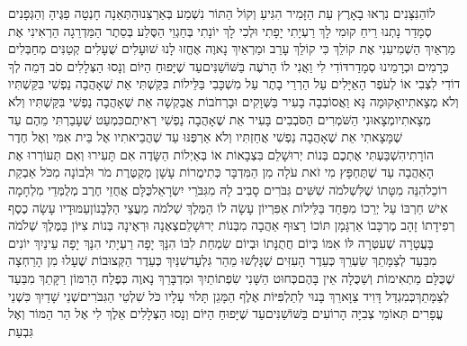 \documentclass[../main/main.tex]{subfiles}
\begin{document}
\begin{multicols*}{\ncols}
לוֹ\PreVerseSpace{}הַנִּצָּנִים נִרְאוּ בָאָרֶץ עֵת הַזָּמִיר הִגִּיעַ וְקוֹל הַתּוֹר נִשְׁמַע בְּאַרְצֵנוּ\PreVerseSpace{}הַתְּאֵנָה חָנְטָה פַגֶּיהָ וְהַגְּפָנִים סְמָדַר נָתְנוּ רֵיחַ קוּמִי לָךְ\SubEnd{} רַעְיָתִי יָפָתִי וּלְכִי לָךְ \ClosedSection{}יוֹנָתִי בְּחַגְוֵי הַסֶּלַע בְּסֵתֶר הַמַּדְרֵגָה הַרְאִינִי אֶת מַרְאַיִךְ הַשְׁמִיעִנִי אֶת קוֹלֵךְ כִּי קוֹלֵךְ עָרֵב וּמַרְאַיִךְ\SubEnd{} נָאוֶה \ClosedSection{}אֶחֱזוּ לָנוּ שׁוּעָלִים שֻׁעָלִים קְטַנִּים מְחַבְּלִים כְּרָמִים וּכְרָמֵינוּ סְמָדַר\PreVerseSpace{}דּוֹדִי לִי וַאֲנִי לוֹ הָרֹעֶה בַּשּׁוֹשַׁנִּים\PreVerseSpace{}עַד שֶׁיָּפוּחַ הַיּוֹם וְנָסוּ הַצְּלָלִים סֹב דְּמֵה לְךָ דוֹדִי לִצְבִי אוֹ לְעֹפֶר הָאַיָּלִים עַל הַרְרֵי\SubEnd{} בָתֶר \ClosedSection{}עַל מִשְׁכָּבִי בַּלֵּילוֹת בִּקַּשְׁתִּי אֵת שֶׁאָהֲבָה נַפְשִׁי בִּקַּשְׁתִּיו וְלֹא מְצָאתִיו\PreVerseSpace{}אָקוּמָה נָּא וַאֲסוֹבְבָה בָעִיר בַּשְּׁוָקִים וּבָרְחֹבוֹת אֲבַקְשָׁה אֵת שֶׁאָהֲבָה נַפְשִׁי בִּקַּשְׁתִּיו וְלֹא מְצָאתִיו\PreVerseSpace{}מְצָאוּנִי הַשֹּׁמְרִים הַסֹּבְבִים בָּעִיר אֵת שֶׁאָהֲבָה נַפְשִׁי רְאִיתֶם\PreVerseSpace{}כִּמְעַט שֶׁעָבַרְתִּי מֵהֶם עַד שֶׁמָּצָאתִי אֵת שֶׁאָהֲבָה נַפְשִׁי אֲחַזְתִּיו וְלֹא אַרְפֶּנּוּ עַד שֶׁהֲבֵיאתִיו אֶל בֵּית אִמִּי וְאֶל חֶדֶר הוֹרָתִי\PreVerseSpace{}הִשְׁבַּעְתִּי אֶתְכֶם בְּנוֹת יְרוּשָׁלֵם בִּצְבָאוֹת אוֹ בְּאַיְלוֹת הַשָּׂדֶה אִם תָּעִירוּ וְאִם תְּעוֹרְרוּ אֶת הָאַהֲבָה עַד שֶׁתֶּחְפָּץ \ClosedSection{}מִי זֹאת עֹלָה מִן הַמִּדְבָּר כְּתִימֲרוֹת עָשָׁן מְקֻטֶּרֶת מֹר וּלְבוֹנָה מִכֹּל אַבְקַת רוֹכֵל\PreVerseSpace{}הִנֵּה מִטָּתוֹ שֶׁלִּשְׁלֹמֹה שִׁשִּׁים גִּבֹּרִים סָבִיב לָהּ מִגִּבֹּרֵי יִשְׂרָאֵל\PreVerseSpace{}כֻּלָּם אֲחֻזֵי חֶרֶב מְלֻמְּדֵי מִלְחָמָה אִישׁ חַרְבּוֹ עַל יְרֵכוֹ מִפַּחַד בַּלֵּילוֹת \ClosedSection{}אַפִּרְיוֹן עָשָׂה לוֹ הַמֶּלֶךְ שְׁלֹמֹה מֵעֲצֵי הַלְּבָנוֹן\PreVerseSpace{}עַמּוּדָיו עָשָׂה כֶסֶף רְפִידָתוֹ זָהָב מֶרְכָּבוֹ אַרְגָּמָן תּוֹכוֹ רָצוּף אַהֲבָה מִבְּנוֹת יְרוּשָׁלֵם\PreVerseSpace{}צְאֶנָה וּרְאֶינָה בְּנוֹת צִיּוֹן בַּמֶּלֶךְ שְׁלֹמֹה בָּעֲטָרָה שֶׁעִטְּרָה לּוֹ אִמּוֹ בְּיוֹם חֲתֻנָּתוֹ וּבְיוֹם שִׂמְחַת לִבּוֹ \ClosedSection{}הִנָּךְ יָפָה רַעְיָתִי הִנָּךְ יָפָה עֵינַיִךְ יוֹנִים מִבַּעַד לְצַמָּתֵךְ שַׂעְרֵךְ כְּעֵדֶר הָעִזִּים שֶׁגָּלְשׁוּ מֵהַר גִּלְעָד\PreVerseSpace{}שִׁנַּיִךְ כְּעֵדֶר הַקְּצוּבוֹת שֶׁעָלוּ מִן הָרַחְצָה שֶׁכֻּלָּם מַתְאִימוֹת וְשַׁכֻּלָה אֵין בָּהֶם\PreVerseSpace{}כְּחוּט הַשָּׁנִי שִׂפְתוֹתַיִךְ וּמִדְבָּרֵךְ נָאוֶה כְּפֶלַח הָרִמּוֹן רַקָּתֵךְ מִבַּעַד לְצַמָּתֵךְ\PreVerseSpace{}כְּמִגְדַּל דָּוִיד צַוָּארֵךְ בָּנוּי לְתַלְפִּיּוֹת אֶלֶף הַמָּגֵן תָּלוּי עָלָיו כֹּל שִׁלְטֵי הַגִּבֹּרִים\PreVerseSpace{}שְׁנֵי שָׁדַיִךְ כִּשְׁנֵי עֳפָרִים תְּאוֹמֵי צְבִיָּה הָרוֹעִים בַּשּׁוֹשַׁנִּים\PreVerseSpace{}עַד שֶׁיָּפוּחַ הַיּוֹם וְנָסוּ הַצְּלָלִים אֵלֶךְ לִי אֶל הַר הַמּוֹר וְאֶל גִּבְעַת 
\end{multicols*}
\end{document}
